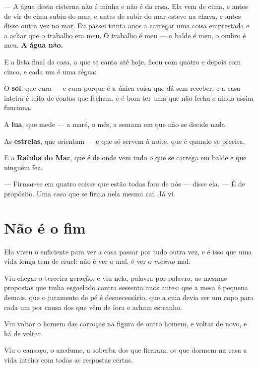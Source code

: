\documentclass[livro.tex]{subfiles}
\begin{document}
--- A água desta cisterna não é minha e não é da casa. Ela vem de cima, e antes de vir de cima
subiu do mar, e antes de subir do mar esteve na chuva, e antes disso outra vez no mar. Eu passei
trinta anos a carregar uma coisa emprestada e a achar que o trabalho era meu. O trabalho é meu ---
o balde é meu, o ombro é meu. \textbf{A água não.}

\medskip

E a lista final da casa, a que se canta até hoje, ficou com quatro e depois com cinco, e cada um
é uma régua:

O \textbf{sol}, que cura --- e cura porque é a única coisa que dá sem receber, e a casa inteira é
feita de contas que fecham, e é bom ter uma que não fecha e ainda assim funciona.

A \textbf{lua}, que mede --- a maré, o mês, a semana em que não se decide nada.

As \textbf{estrelas}, que orientam --- e que só servem à noite, que é quando se precisa.

E a \textbf{Rainha do Mar}, que é de onde vem tudo o que se carrega em balde e que ninguém fez.

\medskip

--- Firmar-se em quatro coisas que estão todas fora de nós --- disse ela. --- É de propósito. Uma
casa que se firma nela mesma cai. Já vi.

\chapter{Não é o fim}

Ela viveu o suficiente para ver a casa passar por tudo outra vez, e é isso que uma vida longa
tem de cruel: não é ver o mal, é ver o \emph{mesmo} mal.

\medskip

Viu chegar a terceira geração, e viu nela, palavra por palavra, as mesmas propostas que \Qui
tinha esgoelado contra sessenta anos antes: que a mesa é pequena demais, que o juramento de pé é
desnecessário, que a cuia devia ser um copo para cada um por causa dos que vêm de fora e acham
estranho.

Viu voltar o homem das carroças na figura de outro homem, e voltar de novo, e há de voltar.

Viu o cansaço, o azedume, a soberba dos que ficaram, os que dormem na casa a vida inteira com
todas as respostas certas.

\medskip
\end{document}
